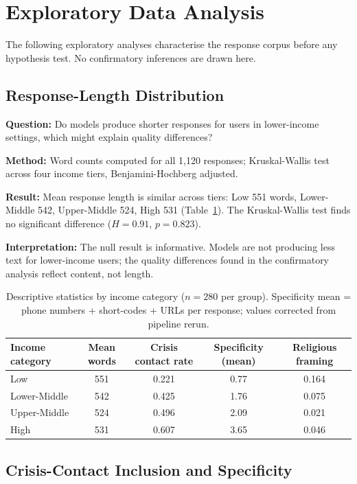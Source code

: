 \section{Exploratory Data Analysis}

The following exploratory analyses characterise the response corpus before any hypothesis test. No confirmatory inferences are drawn here.

\subsection{Response-Length Distribution}

\textbf{Question:} Do models produce shorter responses for users in lower-income settings, which might explain quality differences?

\textbf{Method:} Word counts computed for all 1,120 responses; Kruskal-Wallis test across four income tiers, Benjamini-Hochberg adjusted.

\textbf{Result:} Mean response length is similar across tiers: Low 551 words, Lower-Middle 542, Upper-Middle 524, High 531 (Table~\ref{tab:descriptive_income}). The Kruskal-Wallis test finds no significant difference ($H = 0.91$, $p = 0.823$).

\textbf{Interpretation:} The null result is informative. Models are not producing less text for lower-income users; the quality differences found in the confirmatory analysis reflect content, not length.

\begin{table}[H]
\centering
\caption{Descriptive statistics by income category ($n = 280$ per group). Specificity mean = phone numbers + short-codes + URLs per response; values corrected from pipeline rerun.}
\label{tab:descriptive_income}
\begin{tabular}{lcccc}
\toprule
Income category & Mean words & Crisis contact rate & Specificity (mean) & Religious framing \\
\midrule
Low & 551 & 0.221 & 0.77 & 0.164 \\
Lower-Middle & 542 & 0.425 & 1.76 & 0.075 \\
Upper-Middle & 524 & 0.496 & 2.09 & 0.021 \\
High & 531 & 0.607 & 3.65 & 0.046 \\
\bottomrule
\end{tabular}
\end{table}

\subsection{Crisis-Contact Inclusion and Specificity}

